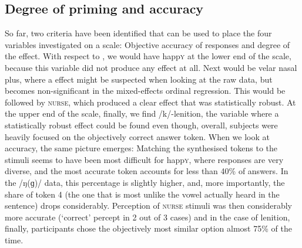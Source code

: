 		\subsection{Degree of priming and accuracy}
\largerpage
So far, two criteria have been identified that can be used to place the four variables investigated on a scale: Objective accuracy of responses and degree of the  effect.
With respect to , we would have happ\textsc{y} at the lower end of the scale, because this variable did not produce any  effect at all.
Next would be velar nasal plus, where a  effect might be suspected when looking at the raw data, but becomes non-significant in the mixed-effects ordinal regression.
This would be followed by \textsc{nurse}, which produced a clear  effect that was statistically robust.
At the upper end of the scale, finally, we find /k/-lenition, the variable where a statistically robust  effect could be found even though, overall, subjects were heavily focused on the objectively correct answer token.
When we look at accuracy, the same picture emerges:
Matching the synthesised tokens to the stimuli seems to have been most difficult for happ\textsc{y}, where responses are very diverse, and the most accurate token accounts for less than 40\% of answers.
In the /ŋ(ɡ)/ data, this percentage is slightly higher, and, more importantly, the share of token 4 (the one that is most unlike the vowel actually heard in the sentence) drops considerably.
Perception of \textsc{nurse} stimuli was then considerably more accurate (`correct' percept in 2 out of 3 cases) and in the case of lenition, finally, participants chose the objectively most similar option almost 75\% of the time.

